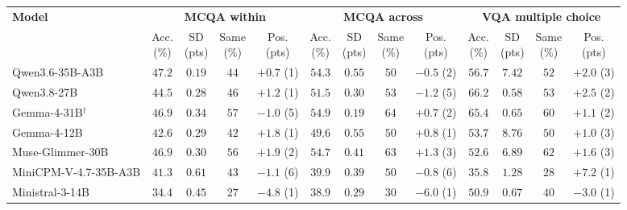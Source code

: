 \setlength{\tabcolsep}{4pt}
\begin{tabular}{lcccccccccccc}
\toprule
\multirow{2}{*}{\textbf{Model}} & \multicolumn{4}{c}{\textbf{MCQA within}} & \multicolumn{4}{c}{\textbf{MCQA across}} & \multicolumn{4}{c}{\textbf{VQA multiple choice}} \\
\cmidrule(lr){2-5} \cmidrule(lr){6-9} \cmidrule(lr){10-13}
 & \makecell{Acc.\\(\%)} & \makecell{SD\\(pts)} & \makecell{Same\\(\%)} & \makecell{Pos.\\(pts)} & \makecell{Acc.\\(\%)} & \makecell{SD\\(pts)} & \makecell{Same\\(\%)} & \makecell{Pos.\\(pts)} & \makecell{Acc.\\(\%)} & \makecell{SD\\(pts)} & \makecell{Same\\(\%)} & \makecell{Pos.\\(pts)} \\
\midrule
Qwen3.6-35B-A3B & $47.2$ & $0.19$ & $44$ & $+0.7$ (1) & $54.3$ & $0.55$ & $50$ & $-0.5$ (2) & $56.7$ & $7.42$ & $52$ & $+2.0$ (3) \\
Qwen3.8-27B & $44.5$ & $0.28$ & $46$ & $+1.2$ (1) & $51.5$ & $0.30$ & $53$ & $-1.2$ (5) & $66.2$ & $0.58$ & $53$ & $+2.5$ (2) \\
Gemma-4-31B$^\dagger$ & $46.9$ & $0.34$ & $57$ & $-1.0$ (5) & $54.9$ & $0.19$ & $64$ & $+0.7$ (2) & $65.4$ & $0.65$ & $60$ & $+1.1$ (2) \\
Gemma-4-12B & $42.6$ & $0.29$ & $42$ & $+1.8$ (1) & $49.6$ & $0.55$ & $50$ & $+0.8$ (1) & $53.7$ & $8.76$ & $50$ & $+1.0$ (3) \\
Muse-Glimmer-30B & $46.9$ & $0.30$ & $56$ & $+1.9$ (2) & $54.7$ & $0.41$ & $63$ & $+1.3$ (3) & $52.6$ & $6.89$ & $62$ & $+1.6$ (3) \\
MiniCPM-V-4.7-35B-A3B & $41.3$ & $0.61$ & $43$ & $-1.1$ (6) & $39.9$ & $0.39$ & $50$ & $-0.8$ (6) & $35.8$ & $1.28$ & $28$ & $+7.2$ (1) \\
Ministral-3-14B & $34.4$ & $0.45$ & $27$ & $-4.8$ (1) & $38.9$ & $0.29$ & $30$ & $-6.0$ (1) & $50.9$ & $0.67$ & $40$ & $-3.0$ (1) \\
\bottomrule
\end{tabular}
